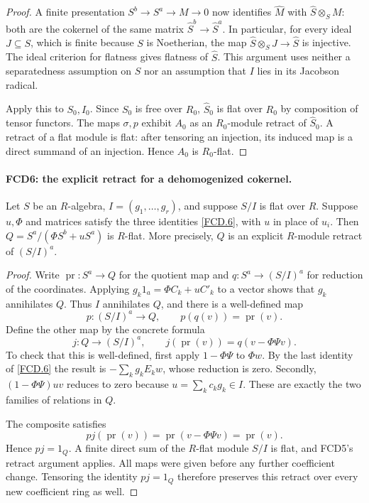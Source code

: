 \documentclass[11pt,a4paper]{article}
\numberwithin{equation}{section}
\theoremstyle{remark}\newtheorem{remark}[theorem]{Remark}
\begin{document}
\begin{proof}
A finite presentation $S^b\to S^a\to M\to0$ now identifies
$\widehat M$ with $\widehat S\otimes_SM$: both are the
cokernel of the same matrix $\widehat S^b\to\widehat S^a$.
In particular, for every ideal $J\subseteq S$, which is finite
because $S$ is Noetherian, the map
$\widehat S\otimes_SJ\to\widehat S$ is injective.
The ideal criterion for flatness gives flatness of $\widehat S$.
This argument uses neither a separatedness assumption on $S$
nor an assumption that $I$ lies in its Jacobson radical.

Apply this to $S_0,I_0$.  Since $S_0$ is free over $R_0$,
$\widehat S_0$ is flat over $R_0$ by composition of tensor
functors.  The maps $\sigma,p$ exhibit $A_0$ as an $R_0$-module
retract of $\widehat S_0$.  A retract of a flat module is flat:
after tensoring an injection, its induced map is a direct summand
of an injection.  Hence $A_0$ is $R_0$-flat.
\end{proof}

\paragraph{FCD6: the explicit retract for a dehomogenized cokernel.}
\label{claim:FCD6}
Let $S$ be an $R$-algebra, $I=(g_1,\ldots,g_r)$, and suppose
$S/I$ is flat over $R$.  Suppose $u,\Phi$ and matrices satisfy
the three identities \eqref{FCD.6}, with $u$ in place of $u_i$.
Then
$Q=S^a/(\Phi S^b+uS^a)$ is $R$-flat.  More precisely, $Q$ is
an explicit $R$-module retract of $(S/I)^a$.

\begin{proof}
Write $\operatorname{pr}:S^a\to Q$ for the quotient map and
$q:S^a\to(S/I)^a$ for reduction of the coordinates.
Applying $g_k1_a=\Phi C_k+uC'_k$ to a vector shows that
$g_k$ annihilates $Q$.  Thus $I$ annihilates $Q$, and there is
a well-defined map
\[
 p:(S/I)^a\longrightarrow Q,\qquad p(q(v))=\operatorname{pr}(v).
\]
Define the other map by the concrete formula
\[
 j:Q\longrightarrow(S/I)^a,\qquad
 j(\operatorname{pr}(v))=q(v-\Phi\Psi v).             \tag{FCD.8}\label{FCD.8}
\]
To check that this is well-defined, first apply $1-\Phi\Psi$
to $\Phi w$.  By the last identity of \eqref{FCD.6} the result
is $-\sum_k g_kE_kw$, whose reduction is zero.  Secondly,
$(1-\Phi\Psi)uv$ reduces to zero because
$u=\sum_kc_kg_k\in I$.  These are exactly the two families
of relations in $Q$.

The composite satisfies
\[
 p j(\operatorname{pr}(v))
 =\operatorname{pr}(v-\Phi\Psi v)=\operatorname{pr}(v).
\]
Hence $pj=1_Q$.  A finite direct sum of the $R$-flat module
$S/I$ is flat, and FCD5's retract argument applies.  All maps
were given before any further coefficient change.  Tensoring the
identity $pj=1_Q$ therefore preserves this retract over every
new coefficient ring as well.
\end{proof}
\end{document}
